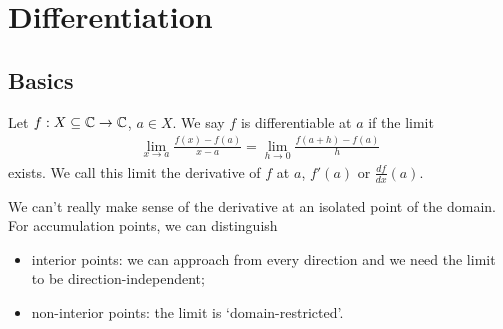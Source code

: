 \documentclass{../template/note}
\begin{document}
    
    

    \section{Differentiation}

    \subsection{Basics}

    \begin{definition}[Derivative]
        Let \(f: X \subseteq \mathbb C \to \mathbb C\), \(a \in X\). We say \(f\) is differentiable at \(a\) if the limit
        \begin{align*}
            \lim_{x \to a} \frac{f(x)-f(a)}{x-a} = \lim_{h \to 0} \frac{f(a+h)-f(a)}{h}
        \end{align*}
        exists. We call this limit the derivative of \(f\) at \(a\), \(f'(a)\) or \(\frac{df}{dx}(a)\).        
    \end{definition}
    
    \begin{remark*}
        We can't really make sense of the derivative at an isolated point of the domain. For accumulation points, we can distinguish
        \begin{itemize}
            \item interior points: we can approach from every direction and we need the limit to be direction-independent;
            \item non-interior points: the limit is `domain-restricted'.
        \end{itemize}
    \end{remark*}
    
\end{document}
